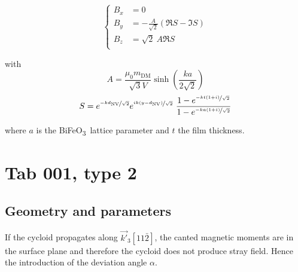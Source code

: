 \documentclass[a4paper,12pt]{article}
\newcommand{\BFO}{BiFeO\textsubscript{3}\ }
\begin{document}
\begin{equation*}
    \left \lbrace
      \begin{aligned}
        B_x &= 0\\
        B_y & = - \frac{A}{\sqrt{2}} \left(  \Re{S}-
          \Im{S} \right)\\
        B_z & =  \sqrt{2} \ A \Re{S}\\
      \end{aligned}
    \right.
  \end{equation*}

  \vspace*{10mm}

  with 
  \[ A = \frac{\mu_0 m_\text{DM}}{\sqrt{3}V}\sinh(\frac{ka}{2\sqrt{2}})\]
  \[S = e^{\nicefrac{-kd_\text{NV}}{\sqrt{2}}} e^{\nicefrac{ik(y-d_\text{NV})}{\sqrt{2}}}   \        \frac{1-e^{\nicefrac{-kt(1+i)}{\sqrt{2}}}}{1-e^{\nicefrac{-ka(1+i)}{\sqrt{2}}}}\]

  where $a$ is the \BFO lattice parameter and $t$ the film thickness.
  
\clearpage
\section{Tab 001, type 2}
\subsection{Geometry and parameters}

If the cycloid propagates along $\vec{k'}_3 [11\bar{2}]$, the canted magnetic moments are in the surface plane and therefore the cycloid does not produce stray field. Hence the introduction of the deviation angle $\alpha$.
\end{document}
